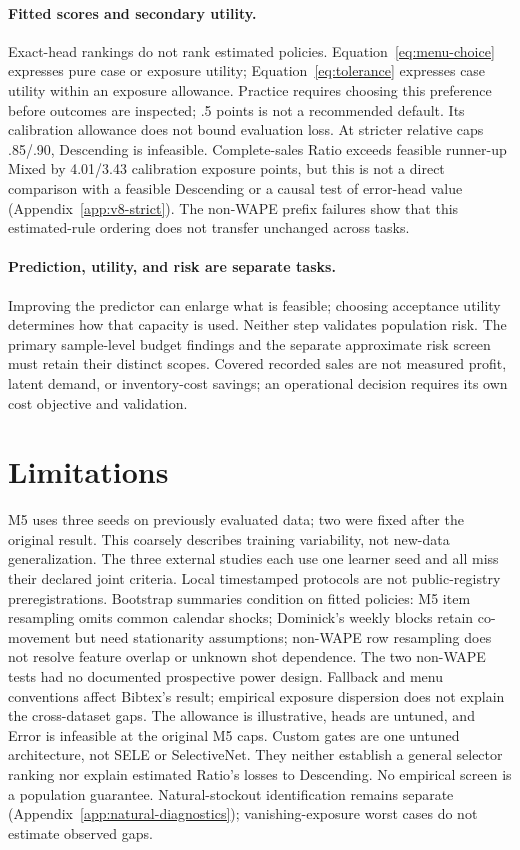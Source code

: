 \documentclass{article}
\begin{document}
\paragraph{Fitted scores and secondary utility.}\label{sec:objectives}\label{sec:groups}
Exact-head rankings do not rank estimated policies. Equation~\eqref{eq:menu-choice} expresses pure case or exposure utility; Equation~\eqref{eq:tolerance} expresses case utility within an exposure allowance. Practice requires choosing this preference before outcomes are inspected; .5 points is not a recommended default. Its calibration allowance does not bound evaluation loss. At stricter relative caps .85/.90, Descending is infeasible. Complete-sales Ratio exceeds feasible runner-up Mixed by 4.01/3.43 calibration exposure points, but this is not a direct comparison with a feasible Descending or a causal test of error-head value (Appendix~\ref{app:v8-strict}). The non-WAPE prefix failures show that this estimated-rule ordering does not transfer unchanged across tasks.

\paragraph{Prediction, utility, and risk are separate tasks.}
Improving the predictor can enlarge what is feasible; choosing acceptance utility determines how that capacity is used. Neither step validates population risk. The primary sample-level budget findings and the separate approximate risk screen must retain their distinct scopes. Covered recorded sales are not measured profit, latent demand, or inventory-cost savings; an operational decision requires its own cost objective and validation.

\section{Limitations}
M5 uses three seeds on previously evaluated data; two were fixed after the original result. This coarsely describes training variability, not new-data generalization. The three external studies each use one learner seed and all miss their declared joint criteria. Local timestamped protocols are not public-registry preregistrations. Bootstrap summaries condition on fitted policies: M5 item resampling omits common calendar shocks; Dominick's weekly blocks retain co-movement but need stationarity assumptions; non-WAPE row resampling does not resolve feature overlap or unknown shot dependence. The two non-WAPE tests had no documented prospective power design. Fallback and menu conventions affect Bibtex's result; empirical exposure dispersion does not explain the cross-dataset gaps. The allowance is illustrative, heads are untuned, and Error is infeasible at the original M5 caps. Custom gates are one untuned architecture, not SELE or SelectiveNet. They neither establish a general selector ranking nor explain estimated Ratio's losses to Descending. No empirical screen is a population guarantee. Natural-stockout identification remains separate (Appendix~\ref{app:natural-diagnostics}); vanishing-exposure worst cases do not estimate observed gaps.
\end{document}
